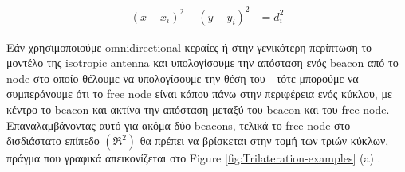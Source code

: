 \begin{align}
	(x-x_i)^2 + (y-y_i)^2 &= d_i^2 \label{eq:trilateration-circles}
\end{align}

Εάν χρησιμοποιούμε omnidirectional κεραίες \cite{Omnidirectional-antenna} ή στην γενικότερη περίπτωση το μοντέλο της isotropic antenna \cite{Isotropic-radiator} και υπολογίσουμε την απόσταση ενός beacon από το node στο οποίο θέλουμε να υπολογίσουμε την θέση του -
τότε μπορούμε να συμπεράνουμε ότι το free node είναι κάπου πάνω στην περιφέρεια ενός 
κύκλου, με κέντρο το beacon και ακτίνα την απόσταση μεταξύ του beacon και του free node. 
Επαναλαμβάνοντας αυτό για ακόμα δύο beacons, τελικά το free node στο δισδιάστατο επίπεδο $(\mathfrak{R}^2)$ θα πρέπει να βρίσκεται στην τομή των τριών κύκλων, πράγμα που γραφικά 
απεικονίζεται στο Figure \ref{fig:Trilateration-examples} (a) \cite{RSSI-trilateration-Range_based}.

